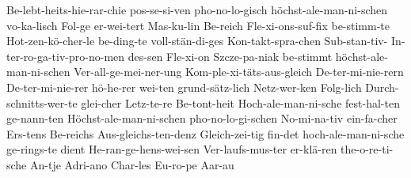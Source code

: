 {Be-lebt-heits-hie-rar-chie
pos-se-si-ven
pho-no-lo-gisch
höchst-ale-man-ni-schen
vo-ka-lisch
Fol-ge
er-wei-tert
Mas-ku-lin
Be-reich
Fle-xi-ons-suf-fix
be-stimm-te
Hot-zen-kö-cher-le
be-ding-te
voll-stän-di-ges
Kon-takt-spra-chen
Sub-stan-tiv-
In-ter-ro-ga-tiv-pro-no-men
des-sen
Fle-xi-on
Szcze-pa-niak
be-stimmt
höchst-ale-man-ni-schen
Ver-all-ge-mei-ner-ung
Kom-ple-xi-täts-aus-gleich
De-ter-mi-nie-rern
De-ter-mi-nie-rer
hö-he-rer
wei-ten
grund-sätz-lich
Netz-wer-ken
Folg-lich
Durch-schnitts-wer-te
glei-cher
Letz-te-re
Be-tont-heit
Hoch-ale-man-ni-sche
fest-hal-ten
ge-nann-ten
Höchst-ale-man-ni-schen
pho-no-lo-gi-schen
No-mi-na-tiv
ein-fa-cher
Ers-tens
Be-reichs
Aus-gleichs-ten-denz
Gleich-zei-tig
fin-det
hoch-ale-man-ni-sche
ge-rings-te
dient
He-ran-ge-hens-wei-sen
Ver-laufs-mus-ter
er-klä-ren
the-o-re-ti-sche
An-tje
Adri-ano
Char-les
Eu-ro-pe
Aar-au
}